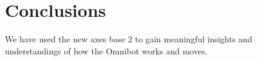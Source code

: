 \documentclass[12pt]{article}
\newcounter{lastnote}
\newenvironment{scilastnote}{%
\setcounter{lastnote}{\value{enumiv}}%
\addtocounter{lastnote}{+1}%
\begin{list}%
{\arabic{lastnote}.}
{\setlength{\leftmargin}{.22in}}
{\setlength{\labelsep}{.5em}}}
{\end{list}}
\begin{document}
\section*{Conclusions}

We have used the new axes base 2 to gain meaningful insights and understandings of how the Omnibot works and moves.


%

%











\end{document}
